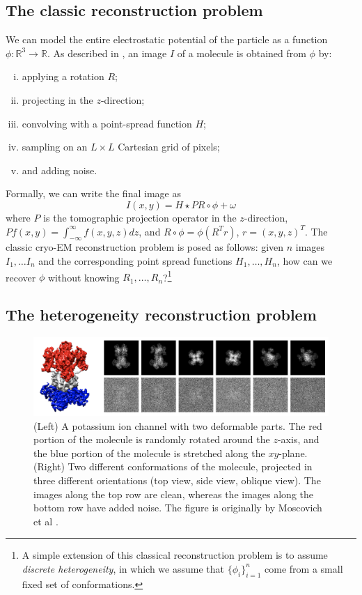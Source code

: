 \documentclass{article}
\numberwithin{equation}{section}
\theoremstyle{definition}
\begin{document}
\subsection{The classic reconstruction problem}
We can model the entire electrostatic potential of the particle as a function $\phi : \mathbb{R}^3 \rightarrow \mathbb{R}$. As described in \cite{singer2018mathematics}, an image $I$ of a molecule is obtained from $\phi$ by:
\begin{enumerate}[(i)]
    \item applying a rotation $R$;
    \item projecting in the $z$-direction;
    \item convolving with a point-spread function $H$;
    \item sampling on an $L \times L$ Cartesian grid of pixels;
    \item and adding noise.
\end{enumerate}
Formally, we can write the final image as
\begin{equation}
    I(x,y) = H \star PR \circ \phi + \omega 
\end{equation}
where $P$ is the tomographic projection operator in the $z$-direction, $P f(x,y) = \int_{-\infty}^\infty f(x,y,z) dz$, and $R \circ \phi = \phi(R^T r)$, $r = (x,y,z)^T$. The classic cryo-EM reconstruction problem is posed as follows: given $n$ images $I_1, \ldots I_n$ and the corresponding point spread functions $H_1, \ldots, H_n$, how can we recover $\phi$ without knowing $R_1, \ldots, R_n$?\footnote{A simple extension of this classical reconstruction problem is to assume \textit{discrete heterogeneity}, in which we assume that $\{\phi_i\}_{i=1}^n$ come from a small fixed set of conformations.}

\subsection{The heterogeneity reconstruction problem}
\begin{figure}
    \centering
    \includegraphics[width=\textwidth]{images/heterogeneity-problem.png}
    \caption{(Left) A potassium ion channel with two deformable parts. The red portion of the molecule is randomly rotated around the $z$-axis, and the blue portion of the molecule is stretched along the $xy$-plane. (Right) Two different conformations of the molecule, projected in three different orientations (top view, side view, oblique view). The images along the top row are clean, whereas the images along the bottom row have added noise. The figure is originally by Moscovich et al \cite{MoscovichHaleviAndenSinger2020}.}
    \label{fig:heterogeneity}
\end{figure}
\end{document}
